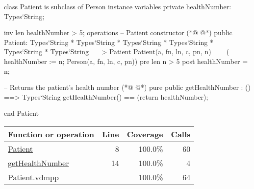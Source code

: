 \begin{vdmpp}[breaklines=true]
class Patient is subclass of Person
instance variables
  private healthNumber: Types`String;
  
  inv len healthNumber > 5;
operations
 -- Patient constructor
(*@
\label{Patient:8}
@*)
 public Patient: Types`String * Types`String * Types`String * Types`String * Types`String * Types`String ==> Patient
  Patient(a, fn, ln, c, pn, n) == ( healthNumber := n; Person(a, fn, ln, c, pn))
 pre len n > 5
 post healthNumber = n;
 
 -- Returns the patient's health number
(*@
\label{getHealthNumber:14}
@*)
 pure public getHealthNumber : () ==> Types`String
  getHealthNumber() == (return healthNumber);

end Patient
\end{vdmpp}
\bigskip
\begin{longtable}{|l|r|r|r|}
\hline
Function or operation & Line & Coverage & Calls \\
\hline
\hline
\hyperref[Patient:8]{Patient} & 8&100.0\% & 60 \\
\hline
\hyperref[getHealthNumber:14]{getHealthNumber} & 14&100.0\% & 4 \\
\hline
\hline
Patient.vdmpp & & 100.0\% & 64 \\
\hline
\end{longtable}

